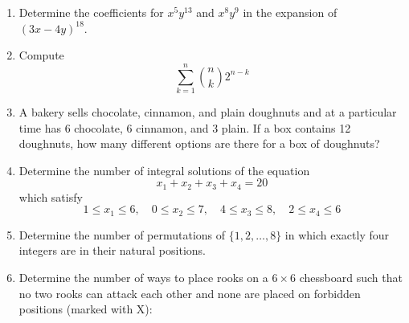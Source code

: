 \documentclass{article}
\theoremstyle{definition}
\begin{document}
\pagestyle{fancy}
\begin{enumerate}
    \item Determine the coefficients for $x^5 y^{13}$ and $x^8 y^9$ in the expansion of $(3x - 4y)^{18}$.

    \item Compute
    \[
    \sum_{k=1}^{n} \binom{n}{k} 2^{n - k}
    \]

    \item A bakery sells chocolate, cinnamon, and plain doughnuts and at a particular time has 6 chocolate, 6 cinnamon, and 3 plain. If a box contains 12 doughnuts, how many different options are there for a box of doughnuts?

    \item Determine the number of integral solutions of the equation
    \[
    x_1 + x_2 + x_3 + x_4 = 20
    \]
    which satisfy
    \[
    1 \leq x_1 \leq 6, \quad 0 \leq x_2 \leq 7, \quad 4 \leq x_3 \leq 8, \quad 2 \leq x_4 \leq 6
    \]

    \item Determine the number of permutations of $\{1, 2, \ldots, 8\}$ in which exactly four integers are in their natural positions.

    \item Determine the number of ways to place rooks on a $6 \times 6$ chessboard such that no two rooks can attack each other and none are placed on forbidden positions (marked with X):
    
    \begin{center}
    \end{center}
    
\end{enumerate}
\end{document}
